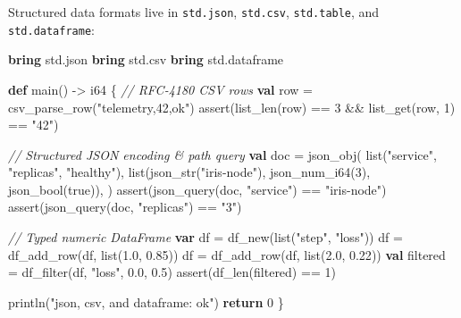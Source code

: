 \documentclass[
  english,
  oneside]{book}
\newenvironment{Shaded}{\begin{snugshade}}{\end{snugshade}}
\newcommand{\CommentTok}[1]{\textcolor[rgb]{0.42,0.60,0.33}{\textit{#1}}}
\newcommand{\ConstantTok}[1]{\textcolor[rgb]{0.31,0.76,1.00}{#1}}
\newcommand{\ControlFlowTok}[1]{\textcolor[rgb]{0.77,0.53,0.75}{\textbf{#1}}}
\newcommand{\DataTypeTok}[1]{\textcolor[rgb]{0.31,0.79,0.69}{#1}}
\newcommand{\DecValTok}[1]{\textcolor[rgb]{0.71,0.81,0.66}{#1}}
\newcommand{\FloatTok}[1]{\textcolor[rgb]{0.71,0.81,0.66}{#1}}
\newcommand{\FunctionTok}[1]{\textcolor[rgb]{0.86,0.86,0.67}{#1}}
\newcommand{\KeywordTok}[1]{\textcolor[rgb]{0.34,0.61,0.84}{\textbf{#1}}}
\newcommand{\NormalTok}[1]{\textcolor[rgb]{0.83,0.83,0.83}{#1}}
\newcommand{\OperatorTok}[1]{\textcolor[rgb]{0.83,0.83,0.83}{#1}}
\newcommand{\StringTok}[1]{\textcolor[rgb]{0.81,0.57,0.47}{#1}}
\begin{document}
Structured data formats live in \texttt{std.json}, \texttt{std.csv},
\texttt{std.table}, and \texttt{std.dataframe}:

\begin{Shaded}
\begin{Highlighting}[]
\KeywordTok{bring}\NormalTok{ std}\OperatorTok{.}\NormalTok{json}
\KeywordTok{bring}\NormalTok{ std}\OperatorTok{.}\NormalTok{csv}
\KeywordTok{bring}\NormalTok{ std}\OperatorTok{.}\NormalTok{dataframe}

\KeywordTok{def}\NormalTok{ main() }\OperatorTok{{-}\textgreater{}} \DataTypeTok{i64}\NormalTok{ \{}
    \CommentTok{// RFC{-}4180 CSV rows}
    \KeywordTok{val}\NormalTok{ row }\OperatorTok{=}\NormalTok{ csv\_parse\_row(}\StringTok{"telemetry,42,ok"}\NormalTok{)}
    \FunctionTok{assert}\NormalTok{(}\FunctionTok{list\_len}\NormalTok{(row) }\OperatorTok{==} \DecValTok{3} \OperatorTok{\&\&} \FunctionTok{list\_get}\NormalTok{(row, }\DecValTok{1}\NormalTok{) }\OperatorTok{==} \StringTok{"42"}\NormalTok{)}

    \CommentTok{// Structured JSON encoding \& path query}
    \KeywordTok{val}\NormalTok{ doc }\OperatorTok{=}\NormalTok{ json\_obj(}
        \DataTypeTok{list}\NormalTok{(}\StringTok{"service"}\NormalTok{, }\StringTok{"replicas"}\NormalTok{, }\StringTok{"healthy"}\NormalTok{),}
        \DataTypeTok{list}\NormalTok{(json\_str(}\StringTok{"iris{-}node"}\NormalTok{), json\_num\_i64(}\DecValTok{3}\NormalTok{), json\_bool(}\ConstantTok{true}\NormalTok{)),}
\NormalTok{    )}
    \FunctionTok{assert}\NormalTok{(json\_query(doc, }\StringTok{"service"}\NormalTok{) }\OperatorTok{==} \StringTok{"iris{-}node"}\NormalTok{)}
    \FunctionTok{assert}\NormalTok{(json\_query(doc, }\StringTok{"replicas"}\NormalTok{) }\OperatorTok{==} \StringTok{"3"}\NormalTok{)}

    \CommentTok{// Typed numeric DataFrame}
    \KeywordTok{var}\NormalTok{ df }\OperatorTok{=}\NormalTok{ df\_new(}\DataTypeTok{list}\NormalTok{(}\StringTok{"step"}\NormalTok{, }\StringTok{"loss"}\NormalTok{))}
\NormalTok{    df }\OperatorTok{=}\NormalTok{ df\_add\_row(df, }\DataTypeTok{list}\NormalTok{(}\FloatTok{1.0}\NormalTok{, }\FloatTok{0.85}\NormalTok{))}
\NormalTok{    df }\OperatorTok{=}\NormalTok{ df\_add\_row(df, }\DataTypeTok{list}\NormalTok{(}\FloatTok{2.0}\NormalTok{, }\FloatTok{0.22}\NormalTok{))}
    \KeywordTok{val}\NormalTok{ filtered }\OperatorTok{=}\NormalTok{ df\_filter(df, }\StringTok{"loss"}\NormalTok{, }\FloatTok{0.0}\NormalTok{, }\FloatTok{0.5}\NormalTok{)}
    \FunctionTok{assert}\NormalTok{(df\_len(filtered) }\OperatorTok{==} \DecValTok{1}\NormalTok{)}

\NormalTok{    println(}\StringTok{"json, csv, and dataframe: ok"}\NormalTok{)}
    \ControlFlowTok{return} \DecValTok{0}
\NormalTok{\}}
\end{Highlighting}
\end{Shaded}
\end{document}
